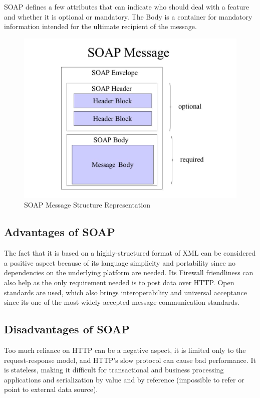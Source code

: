 \documentclass[conference]{IEEEtran}
\begin{document}
SOAP defines a few attributes that can indicate who should deal with a feature and whether it is optional or mandatory. The Body is a container for mandatory information intended for the ultimate recipient of the message.

\begin{figure}
	\centering
	\includegraphics[width=0.8\linewidth]{soap_message.jpg}
	\caption{SOAP Message Structure Representation}
\end{figure}

\subsection{Advantages of SOAP}

The fact that it is based on a highly-structured format of XML can be considered a positive aspect because of its language simplicity and portability since no dependencies on the underlying platform are needed. Its Firewall friendliness can also help as the only requirement needed is to post data over HTTP. Open standards are used, which also brings interoperability and universal acceptance since its one of the most widely accepted message communication standards.

\subsection{Disadvantages of SOAP}

Too much reliance on HTTP can be a negative aspect, it is limited only to the request-response model, and HTTP's slow protocol can cause bad performance. It is stateless, making it difficult for transactional and business processing applications and serialization by value and by reference (impossible to refer or point to external data source).
\end{document}
